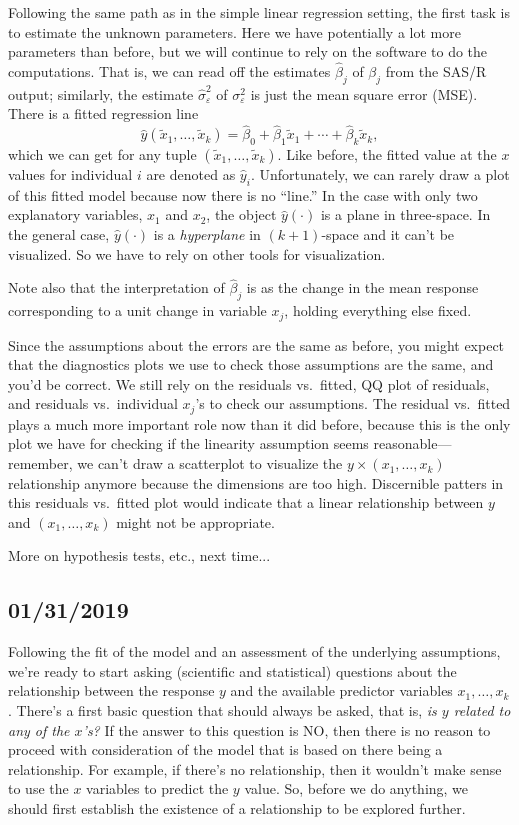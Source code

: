 \documentclass[a4paper, 12pt]{article}
\theoremstyle{plain}
\theoremstyle{definition}
\theoremstyle{remark}
\newcommand{\eps}{\varepsilon}
\begin{document}
Following the same path as in the simple linear regression setting, the first task is to estimate the unknown parameters.  Here we have potentially a lot more parameters than before, but we will continue to rely on the software to do the computations.  That is, we can read off the estimates $\hat\beta_j$ of $\beta_j$ from the SAS/R output; similarly, the estimate $\hat\sigma_\eps^2$ of $\sigma_\eps^2$ is just the mean square error (MSE).  There is a fitted regression line 
\[ \hat y(\tilde x_1, \ldots, \tilde x_k) = \hat\beta_0 + \hat\beta_1 \tilde x_1 + \cdots + \hat\beta_k \tilde x_k, \]
which we can get for any tuple $(\tilde x_1, \ldots, \tilde x_k)$.  Like before, the fitted value at the $x$ values for individual $i$ are denoted as $\hat y_i$.  Unfortunately, we can rarely draw a plot of this fitted model because now there is no ``line.''  In the case with only two explanatory variables, $x_1$ and $x_2$, the object $\hat y(\cdot)$ is a plane in three-space.  In the general case, $\hat y(\cdot)$ is a {\em hyperplane} in $(k+1)$-space and it can't be visualized.  So we have to rely on other tools for visualization.  

Note also that the interpretation of $\hat\beta_j$ is as the change in the mean response corresponding to a unit change in variable $x_j$, holding everything else fixed.  

Since the assumptions about the errors are the same as before, you might expect that the diagnostics plots we use to check those assumptions are the same, and you'd be correct.  We still rely on the residuals vs.~fitted, QQ plot of residuals, and residuals vs.~individual $x_j$'s to check our assumptions.  The residual vs.~fitted plays a much more important role now than it did before, because this is the only plot we have for checking if the linearity assumption seems reasonable---remember, we can't draw a scatterplot to visualize the $y \times (x_1,\ldots,x_k)$ relationship anymore because the dimensions are too high.  Discernible patters in this residuals vs.~fitted plot would indicate that a linear relationship between $y$ and $(x_1,\ldots,x_k)$ might not be appropriate.  

More on hypothesis tests, etc., next time...


\subsection*{01/31/2019}

Following the fit of the model and an assessment of the underlying assumptions, we're ready to start asking (scientific and statistical) questions about the relationship between the response $y$ and the available predictor variables $x_1,\ldots,x_k$.  There's a first basic question that should always be asked, that is, {\em is $y$ related to any of the $x$'s?}  If the answer to this question is NO, then there is no reason to proceed with consideration of the model that is based on there being a relationship.  For example, if there's no relationship, then it wouldn't make sense to use the $x$ variables to predict the $y$ value.  So, before we do anything, we should first establish the existence of a relationship to be explored further.  
\end{document}
